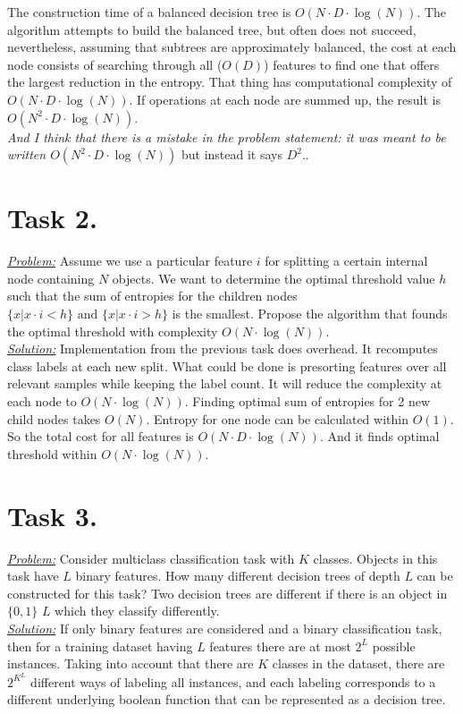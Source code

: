 \documentclass[a4paper,12pt]{article}
\begin{document}
The construction time of a balanced
decision tree is \(O(N\cdot D\cdot \log(N))\). The algorithm attempts to build
the balanced tree, but often does not succeed, nevertheless, assuming that
subtrees are approximately balanced, the cost at each node consists of
searching through all (\(O(D)\)) features to find one that offers the largest
reduction in the entropy. That thing has computational complexity of
\(O(N\cdot D \cdot \log(N))\). If operations at each node are summed up, the
result is \(O(N^2\cdot D\cdot \log(N))\). \\
\newline
\textit{And I think that there is a mistake in the problem statement: it was meant to be written \(O(N^2\cdot D\cdot \log(N))\)} but instead it says $D^2$..

\newpage
\section*{Task 2.}
\underline{\textit{Problem:}} Assume we use a particular feature \(i\) for
splitting a certain internal node containing \(N\) objects. We
want to determine the optimal threshold value \(h
\) such that the sum of entropies for the children nodes
\(\{x|x\cdot i < h\} \text{ and } \{x|x\cdot i > h\}\) is the smallest. Propose the algorithm that founds the optimal threshold
with complexity \(O(N\cdot \log(N))\).\\
\newline
\underline{\textit{Solution:}} Implementation from the previous task does
overhead. It recomputes class labels at each new split. What could be done is
presorting features over all relevant samples while keeping the label count. It
will reduce the complexity at each node to \(O(N\cdot \log(N))\). Finding
optimal sum of entropies for 2 new child nodes takes \(O(N)\). Entropy for one
node can be calculated within \(O(1)\).\\
So the total cost for all features is \(O(N\cdot D\cdot \log(N))\). And it finds optimal threshold within \(O(N\cdot \log(N))\).

\section*{Task 3.}
\underline{\textit{Problem:}} Consider multiclass
classification task with \(K\) classes. Objects in this task have \(L\) binary
features.  How many different decision trees of depth \(L\) can be constructed
for this task? Two decision trees are different if there is an object in \(\{0,
1\}\) \(L\) which they classify differently.\\
\newline
\underline{\textit{Solution:}} If only binary features are considered and a
binary classification task, then for a training dataset having $L$ features
there are at most \(2^L\) possible instances. Taking into account that there
are $K$ classes in the dataset, there are \(2^{K^L}\) different ways of labeling
all instances, and each labeling corresponds to a different underlying boolean
function that can be represented as a decision tree.
\end{document}
